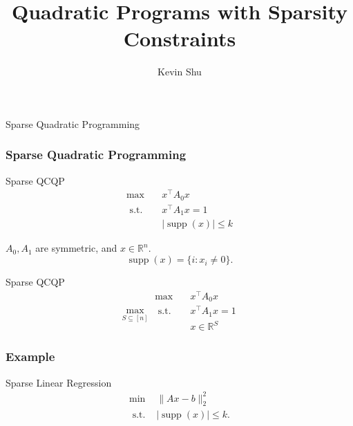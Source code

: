 \documentclass{beamer}
\title{Quadratic Programs with Sparsity Constraints}
\author{Kevin Shu\inst{1}}
\institute{\inst{1} Georgia Institute of Technology}
\date{}
\newcommand{\R}{\mathbb{R}}
\DeclareMathOperator*{\supp}{supp}
\newcommand{\st}{{\text{ s.t. }}}
\begin{document}
\frame{\titlepage}
\begin{frame}
    \centering
    \huge
    {\color{gray}Sparse Quadratic Programming}
\end{frame}
\begin{frame}
\frametitle{Sparse Quadratic Programming}
\begin{block}{Sparse QCQP}
    \begin{equation*}
        \begin{aligned}
            \max\quad & x^{\intercal}A_0x\\
            \st & x^{\intercal}A_1x = 1\\
                &|\supp(x)| \le k
        \end{aligned}
    \end{equation*}
\end{block}

    $A_0, A_1$ are symmetric, and $x \in \R^n$. 
    \[
        \supp(x) = \{i : x_i \neq 0\}.
    \]

\end{frame}
\begin{frame}
\begin{block}{Sparse QCQP}
    \begin{equation*}
        \max_{S \subseteq [n]}
        \begin{aligned}
            \max\quad & x^{\intercal}A_0x\\
            \st & x^{\intercal}A_1x = 1\\
                &x \in \R^S
        \end{aligned}
    \end{equation*}
\end{block}
\end{frame}
\begin{frame}
    \frametitle{Example}
    \begin{block}{Sparse Linear Regression}
        \begin{equation*}
            \begin{aligned}
            \min & \|Ax - b\|_2^2\\
            \st & |\supp(x)| \le k.
            \end{aligned}
        \end{equation*}
    \end{block}
\end{frame}
\end{document}
